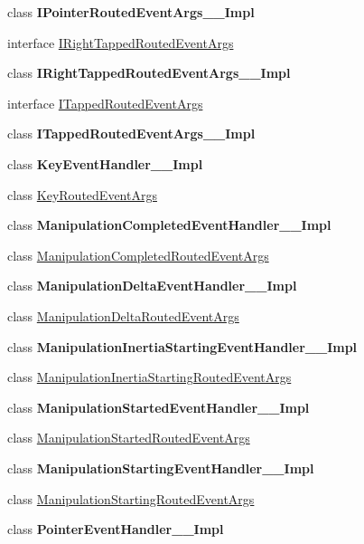 \begin{DoxyCompactItemize}
class {\bfseries I\+Pointer\+Routed\+Event\+Args\+\_\+\+\_\+\+Impl}
\item 
interface \hyperlink{interface_windows_1_1_u_i_1_1_xaml_1_1_input_1_1_i_right_tapped_routed_event_args}{I\+Right\+Tapped\+Routed\+Event\+Args}
\item 
class {\bfseries I\+Right\+Tapped\+Routed\+Event\+Args\+\_\+\+\_\+\+Impl}
\item 
interface \hyperlink{interface_windows_1_1_u_i_1_1_xaml_1_1_input_1_1_i_tapped_routed_event_args}{I\+Tapped\+Routed\+Event\+Args}
\item 
class {\bfseries I\+Tapped\+Routed\+Event\+Args\+\_\+\+\_\+\+Impl}
\item 
class {\bfseries Key\+Event\+Handler\+\_\+\+\_\+\+Impl}
\item 
class \hyperlink{class_windows_1_1_u_i_1_1_xaml_1_1_input_1_1_key_routed_event_args}{Key\+Routed\+Event\+Args}
\item 
class {\bfseries Manipulation\+Completed\+Event\+Handler\+\_\+\+\_\+\+Impl}
\item 
class \hyperlink{class_windows_1_1_u_i_1_1_xaml_1_1_input_1_1_manipulation_completed_routed_event_args}{Manipulation\+Completed\+Routed\+Event\+Args}
\item 
class {\bfseries Manipulation\+Delta\+Event\+Handler\+\_\+\+\_\+\+Impl}
\item 
class \hyperlink{class_windows_1_1_u_i_1_1_xaml_1_1_input_1_1_manipulation_delta_routed_event_args}{Manipulation\+Delta\+Routed\+Event\+Args}
\item 
class {\bfseries Manipulation\+Inertia\+Starting\+Event\+Handler\+\_\+\+\_\+\+Impl}
\item 
class \hyperlink{class_windows_1_1_u_i_1_1_xaml_1_1_input_1_1_manipulation_inertia_starting_routed_event_args}{Manipulation\+Inertia\+Starting\+Routed\+Event\+Args}
\item 
class {\bfseries Manipulation\+Started\+Event\+Handler\+\_\+\+\_\+\+Impl}
\item 
class \hyperlink{class_windows_1_1_u_i_1_1_xaml_1_1_input_1_1_manipulation_started_routed_event_args}{Manipulation\+Started\+Routed\+Event\+Args}
\item 
class {\bfseries Manipulation\+Starting\+Event\+Handler\+\_\+\+\_\+\+Impl}
\item 
class \hyperlink{class_windows_1_1_u_i_1_1_xaml_1_1_input_1_1_manipulation_starting_routed_event_args}{Manipulation\+Starting\+Routed\+Event\+Args}
\item 
class {\bfseries Pointer\+Event\+Handler\+\_\+\+\_\+\+Impl}

\end{DoxyCompactItemize}
